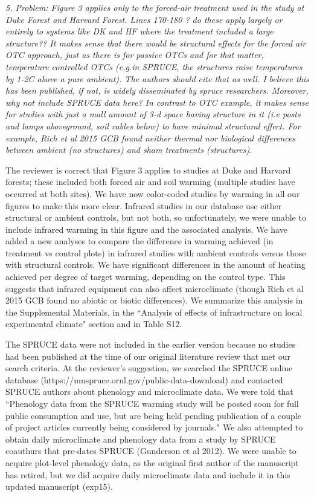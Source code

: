 \documentclass[11pt,a4paper]{letter}
\begin{document}
\begin{letter}{}
\par \emph{5. Problem: Figure 3 applies only to the forced-air treatment used in the study at Duke Forest and Harvard Forest. Lines 170-180 ? do these apply largely or entirely to systems like DK and HF where the treatment included a large structure?? It makes sense that there would be structural effects for the forced air OTC approach, just as there is for passive OTCs and for that matter, temperature controlled OTCs (e.g.in SPRUCE, the structures raise temperatures by 1-2C above a pure ambient). The authors should cite that as well. I believe this has been published, if not, is widely disseminated by spruce researchers. Moreover, why not include SPRUCE data here? In contrast to OTC example, it makes sense for studies with just a  mall amount of 3-d space having structure in it (i.e posts and lamps aboveground, soil cables below) to have minimal structural effect. For example, Rich et al 2015 GCB found neither thermal nor biological differences between ambient (no structures) and sham treatments (structures).}
\par The reviewer is correct that Figure 3 applies to studies at Duke and Harvard forests; these included both forced air and soil warming (multiple studies have occurred at both sites). We have now color-coded studies by warming in all our figures to make this more clear. Infrared studies in our database use either structural or ambient controls, but not both, so unfortunately, we were unable to include infrared warming in this figure and the associated analysis. We have added a new analyses to compare the difference in warming achieved (in treatment vs control plots) in infrared studies with ambient controls versus those with structural controls. We have significant differences in the amount of heating achieved per degree of target warming, depending on the control type. This suggests that infrared equipment can also affect microclimate (though  Rich et al 2015 GCB found no abiotic or biotic differences). We summarize this analysis in the Supplemental Materials, in the ``Analysis of effects of infrastructure on local experimental climate" section and in Table S12.
\par The SPRUCE data were not included in the earlier version because no studies had been published at the time of our original literature review that met our search criteria.  At the reviewer's suggestion, we searched the SPRUCE online database (https://mnspruce.ornl.gov/public-data-download) and contacted SPRUCE authors about phenology and microclimate data. We were told that ``Phenology data from the SPRUCE warming study will be posted soon for full public consumption and use, but are being held pending publication of a couple of project articles currently being considered by journals." We also attempted to obtain daily microclimate and phenology data from a study by SPRUCE coauthurs that pre-dates SPRUCE (Gunderson et al 2012). We were unable to acquire plot-level phenology data, as the original first author of the manuscript has retired, but we did acquire daily microclimate data and include it in this updated manuscript (exp15).

\end{letter}
\end{document}
